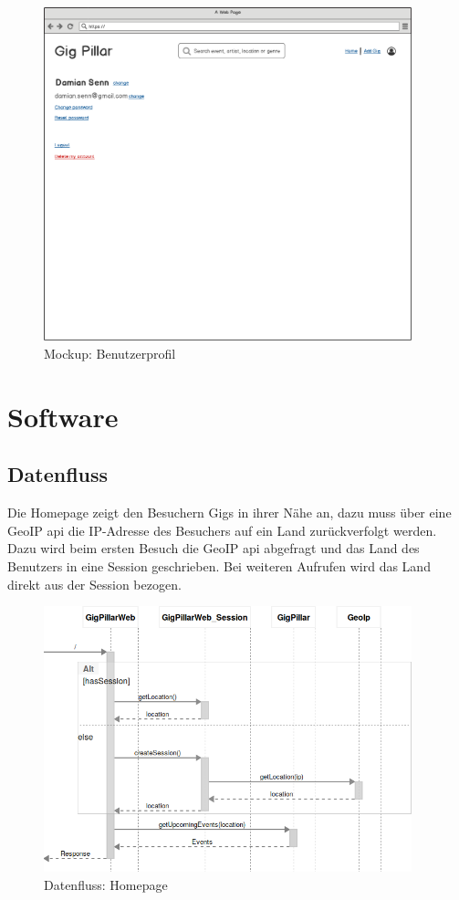 \begin{figure}[!htb]
  \centering
  \includegraphics[width=0.95\textwidth]{mockups/profile.png}
  \caption{Mockup: Benutzerprofil}
\end{figure}

\clearpage
\section{Software}

\subsection{Datenfluss}

Die Homepage zeigt den Besuchern Gigs in ihrer Nähe an, dazu muss über eine
GeoIP \acrshort{api} die IP-Adresse des Besuchers auf ein Land zurückverfolgt werden.
Dazu wird beim ersten Besuch die GeoIP \acrshort{api} abgefragt und das Land des Benutzers
in eine Session geschrieben. Bei weiteren Aufrufen wird das Land direkt aus der
Session bezogen.

\begin{figure}[!htb]
  \centering
  \includegraphics[width=0.95\textwidth]{konzept/datenfluss-homepage.png}
  \caption{Datenfluss: Homepage}
\end{figure}

